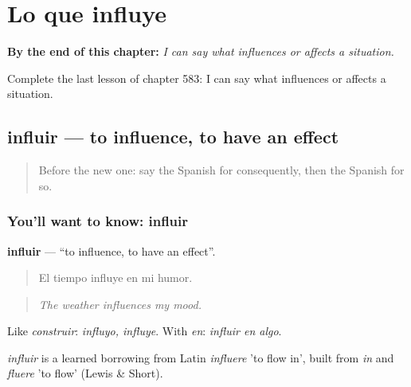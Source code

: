 
\chapter{Lo que influye}
\label{ch:es-lo-que-influye}

\begin{chapteropening}
\textbf{By the end of this chapter:} \emph{I can say what influences or affects a situation.}

Complete the last lesson of chapter 583: I can say what influences or affects a situation.
\end{chapteropening}

\section[influir]{influir — to influence, to have an effect}

\label{lesson:ES-C583-influir}



\begin{quote}
Before the new one: say the Spanish for consequently, then the Spanish for so.
\end{quote}

\subsection*{You'll want to know: influir}
\textbf{influir} — \textquotedblleft{}to influence, to have an effect\textquotedblright{}.

\begin{quote}
El tiempo influye en mi humor.
\end{quote}

\begin{quote}
\emph{The weather influences my mood.}
\end{quote}

Like \emph{construir}: \emph{influyo, influye}. With \emph{en}: \emph{influir en algo}.

\begin{cousinweb}
\emph{influir} is a learned borrowing from Latin \emph{influere} 'to flow in', built from \emph{in} and \emph{fluere} 'to flow' (Lewis \& Short).
\end{cousinweb}

